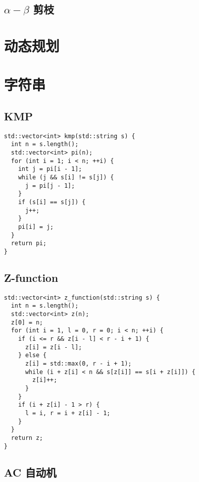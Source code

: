 \documentclass[a4paper,11pt,twoside,fontset = fandol,UTF8]{ctexbook} %
\begin{document}
\section{$\alpha-\beta$ 剪枝}

\chapter{动态规划}

\chapter{字符串}

\section{KMP}

\begin{lstlisting}
std::vector<int> kmp(std::string s) {
  int n = s.length();
  std::vector<int> pi(n);
  for (int i = 1; i < n; ++i) {
    int j = pi[i - 1];
    while (j && s[i] != s[j]) {
      j = pi[j - 1];
    }
    if (s[i] == s[j]) {
      j++;
    }
    pi[i] = j;
  }
  return pi;
}
\end{lstlisting}

\section{Z-function}

\begin{lstlisting}
std::vector<int> z_function(std::string s) {
  int n = s.length();
  std::vector<int> z(n);
  z[0] = n;
  for (int i = 1, l = 0, r = 0; i < n; ++i) {
    if (i <= r && z[i - l] < r - i + 1) {
      z[i] = z[i - l];
    } else {
      z[i] = std::max(0, r - i + 1);
      while (i + z[i] < n && s[z[i]] == s[i + z[i]]) {
        z[i]++;
      }
    }
    if (i + z[i] - 1 > r) {
      l = i, r = i + z[i] - 1;
    }
  }
  return z;
}
\end{lstlisting}

\section{AC 自动机}
\end{document}
